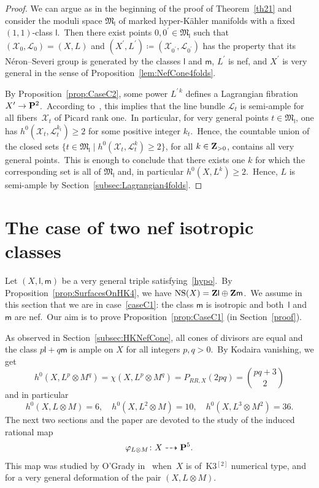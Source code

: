 \documentclass[12pt]{amsart}
\def\cL{\mathscr{L}}
\def\cX{\mathscr{X}}
\def\Z{{\bf Z}}
\def\P{{\bf P}}
\def\phi{\varphi}
\DeclareMathOperator{\NS}{NS}
\def\otp{}
\def\dra{\dashrightarrow}
\theoremstyle{remark}
\def\lll{\ensuremath{\mathsf l}}
\def\mm{\ensuremath{\mathsf m}}
\begin{document}
\begin{proof}
We can argue as in the beginning of the proof of Theorem~\ref{th21} and consider the moduli space ${\mathfrak M}_\lll$ of marked hyper-K\"ahler manifolds with a fixed $(1,1)$-class $\lll$.\
Then there exist  points $0,0^\prime\in {\mathfrak M}_\lll$ such that $(\cX_0,\cL_0)=(X,L)$ and $(X^\prime,L^\prime)\coloneqq (\cX_{0^\prime},\cL_{0^\prime})$ has the property that its N\'eron--Severi group is generated by the classes $\lll$ and $\mm$, $L^\prime$ is nef, and $X^\prime$ is very general in the sense of Proposition~\ref{lem:NefCone4folds}.

By Proposition~\ref{prop:CaseC2}, some power $L^{\prime\,k}$ defines a Lagrangian fibration $X^\prime\to\P^2$.\
According to~\cite[Lemma 2.4]{matlag}, this implies that the line bundle $\cL_t$ is semi-ample for all fibers~$\cX_t$ of Picard rank one.\
In particular, for   very general points $t\in{\mathfrak M}_\lll$, one has $h^0(\cX_t,\cL_t^{k_t})\geq2$ for some positive integer $k_t$.\
Hence, the  countable union  of the  closed sets $\{t\in{\mathfrak M}_\lll\mid h^0(\cX_t,\cL_t^{k})\geq2\}$, for all $k\in\Z_{>0}$,  contains all very general points.\
This is enough to conclude that there exists one $k$ for which the corresponding set is all of ${\mathfrak M}_\lll$ and, in particular $h^0(X,L^k)\geq2$.\
Hence, $L$ is semi-ample by Section~\ref{subsec:Lagrangian4folds}.
\end{proof}



\section{The case of two nef isotropic classes}\label{sec:TwoNefIsotropic}

Let $(X,\lll,\mm)$ be a very general triple satisfying~\eqref{hypo}.\
By Proposition~\ref{prop:SurfacesOnHK4}, we have  $\NS(X)=\Z\lll\oplus\Z\mm$.\
We assume in this section that we are in case~\ref{caseC1}: the class $\mm$ is isotropic and both~$\lll$ and $\mm$ are nef.\ Our aim is to prove Proposition~\ref{prop:CaseC1} (in Section~\ref{proof}).

As observed in Section~\ref{subsec:HKNefCone}, all cones of divisors are equal and the class $p \lll+q \mm$ is ample on $X$ for all integers $p,q>0$.\
By Kodaira vanishing, we get
\begin{equation}\label{eq:KodairaVanishingTwoNef}
h^0(X,L^{\otp p}\otimes M^{\otp q})=\chi(X,  L^{\otp p}\otimes M^{\otp q})=P_{RR,X}(2pq) =\binom{pq+3}{2}
\end{equation}
and in particular
\[
h^0(X,L\otimes M)=6,\quad h^0(X, L^{\otp 2}\otimes M)=10,\quad h^0(X, L^{\otp 3}\otimes  M^{\otp 2})=36.
\]
The next two sections and the paper  \cite{voisinfib} are devoted to the  study of  the induced rational map
\[
\phi_{L\otimes M}\colon X\dra \P^5.
\]
This map was studied by O'Grady in~\cite[Section~4]{og1} when~$X$ is   of~K3$^{[2]}$ numerical type, and for a very general deformation of the pair $(X,L\otimes M)$.\ 
\end{document}
